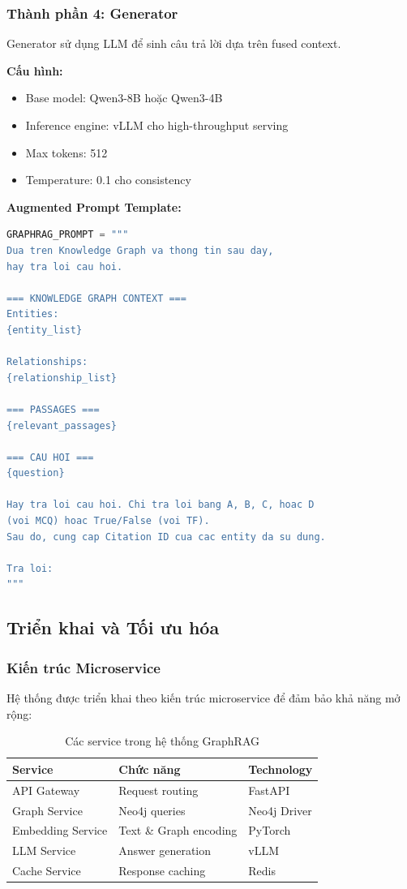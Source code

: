 \subsubsection{Thành phần 4: Generator}

Generator sử dụng LLM để sinh câu trả lời dựa trên fused context.

\textbf{Cấu hình:}
\begin{itemize}
    \item Base model: Qwen3-8B hoặc Qwen3-4B
    \item Inference engine: vLLM cho high-throughput serving
    \item Max tokens: 512
    \item Temperature: 0.1 cho consistency
\end{itemize}

\textbf{Augmented Prompt Template:}
\begin{lstlisting}[language=Python, caption={GraphRAG prompt template}]
GRAPHRAG_PROMPT = """
Dua tren Knowledge Graph va thong tin sau day, 
hay tra loi cau hoi.

=== KNOWLEDGE GRAPH CONTEXT ===
Entities:
{entity_list}

Relationships:
{relationship_list}

=== PASSAGES ===
{relevant_passages}

=== CAU HOI ===
{question}

Hay tra loi cau hoi. Chi tra loi bang A, B, C, hoac D 
(voi MCQ) hoac True/False (voi TF).
Sau do, cung cap Citation ID cua cac entity da su dung.

Tra loi:
"""
\end{lstlisting}

\subsection{Triển khai và Tối ưu hóa}

\subsubsection{Kiến trúc Microservice}

Hệ thống được triển khai theo kiến trúc microservice để đảm bảo khả năng mở rộng:

\begin{table}[H]
\centering
\caption{Các service trong hệ thống GraphRAG}
\label{tab:services}
\begin{tabular}{|l|l|l|}
\hline
\textbf{Service} & \textbf{Chức năng} & \textbf{Technology} \\
\hline
API Gateway & Request routing & FastAPI \\
Graph Service & Neo4j queries & Neo4j Driver \\
Embedding Service & Text \& Graph encoding & PyTorch \\
LLM Service & Answer generation & vLLM \\
Cache Service & Response caching & Redis \\
\hline
\end{tabular}
\end{table}


